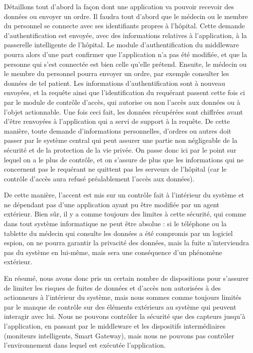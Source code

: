 Détaillons tout d’abord la façon dont une application va pouvoir recevoir des données ou envoyer un ordre. Il faudra tout d’abord que le médecin ou le membre du personnel se connecte avec ses identifiants propres à l’hôpital. Cette demande d’authentification est envoyée, avec des informations relatives à l’application, à la passerelle intelligente de l’hôpital. Le module d’authentification du middleware pourra alors d’une part confirmer que l’application n’a pas été modifiée, et que la personne qui s’est connectée est bien celle qu’elle prétend. Ensuite, le médecin ou le membre du personnel pourra envoyer un ordre, par exemple consulter les données de tel patient. Les informations d’authentification sont à nouveau envoyées, et la requête ainsi que l’identification du requérant passent cette fois ci par le module de contrôle d’accès, qui autorise ou non l’accès aux données ou à l’objet actionnable. Une fois ceci fait, les données récupérées sont chiffrées avant d’être renvoyées à l’application qui a servi de support à la requête. De cette manière, toute demande d’informations personnelles, d’ordres ou autres doit passer par le système central qui peut assurer une partie non négligeable de la sécurité et de la protection de la vie privée. On passe donc ici par le point sur lequel on a le plus de contrôle, et on s’assure de plus que les informations qui ne concernent pas le requérant ne quittent pas les serveurs de l’hôpital (car le contrôle d’accès aura refusé préalablement l’accès aux données).

De cette manière, l’accent est mis sur un contrôle fait à l’intérieur du système et ne dépendant pas d’une application ayant pu être modifiée par un agent extérieur. Bien sûr, il y a comme toujours des limites à cette sécurité, qui comme dans tout système informatique ne peut être absolue : si le téléphone ou la tablette du médecin qui consulte les données a été compromis par un logiciel espion, on ne pourra garantir la privacité des données, mais la fuite n’interviendra pas du système en lui-même, mais sera une conséquence d’un phénomène extérieur.

En résumé, nous avons donc pris un certain nombre de dispositions pour s’assurer de limiter les risques de fuites de données et d’accès non autorisées à des actionneurs à l’intérieur du système, mais nous sommes comme toujours limités par le manque de contrôle sur des éléments extérieurs au système qui peuvent interagir avec lui. Nous ne pouvons contrôler la sécurité que des capteurs jusqu’à l’application, en passant par le middleware et les dispositifs intermédiaires (moniteurs intelligents, Smart Gateway), mais nous ne pouvons pas contrôler l’environnement dans lequel est exécutée l’application.
